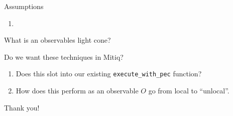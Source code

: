\documentclass[11pt,aspectratio=1610,xcolor=dvipsnames]{beamer}
\begin{document}
\begin{frame}{Assumptions}
	\begin{enumerate}
		\item
	\end{enumerate}
\end{frame}

\begin{frame}{What is an observables light cone?}

\end{frame}


\begin{frame}[fragile]{Do we want these techniques in Mitiq?}
	\begin{enumerate}
		\item Does this slot into our existing \verb|execute_with_pec| function?
		\item How does this perform as an observable $O$ go from local to ``unlocal''.
	\end{enumerate}
\end{frame}

\begin{frame}[standout]
	Thank you!
\end{frame}
\end{document}
